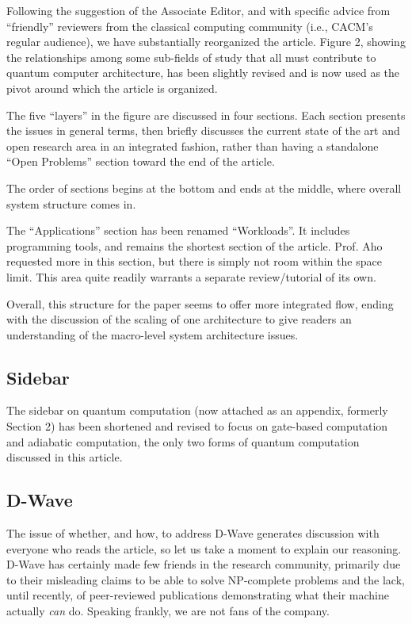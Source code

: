 \documentclass{article}
\begin{document}
Following the suggestion of the Associate Editor, and with specific
advice from ``friendly'' reviewers from the classical computing
community (i.e., CACM's regular audience), we have substantially
reorganized the article.  Figure 2, showing the relationships among
some sub-fields of study that all must contribute to quantum computer
architecture, has been slightly revised and is now used as the pivot
around which the article is organized.

The five ``layers'' in the figure are discussed in four sections.
Each section presents the issues in general terms, then briefly
discusses the current state of the art and open research area in an
integrated fashion, rather than having a standalone ``Open Problems''
section toward the end of the article.

The order of sections begins at the bottom and ends at the middle,
where overall system structure comes in.

The ``Applications'' section has been renamed ``Workloads''.  It
includes programming tools, and remains the shortest section of the
article.  Prof. Aho requested more in this section, but there is
simply not room within the space limit.  This area quite readily
warrants a separate review/tutorial of its own.

Overall, this structure for the paper seems to offer more integrated
flow, ending with the discussion of the scaling of one architecture to
give readers an understanding of the macro-level system architecture
issues.

\subsection{Sidebar}

The sidebar on quantum computation (now attached as an appendix,
formerly Section 2) has been shortened and revised to focus on
gate-based computation and adiabatic computation, the only two forms
of quantum computation discussed in this article.

\subsection{D-Wave}
\label{sec:d-wave}

The issue of whether, and how, to address D-Wave generates discussion
with everyone who reads the article, so let us take a moment to
explain our reasoning.  D-Wave has certainly made few friends in the
research community, primarily due to their misleading claims to be
able to solve NP-complete problems and the lack, until recently, of
peer-reviewed publications demonstrating what their machine actually
{\em can} do.  Speaking frankly, we are not fans of the company.
\end{document}
